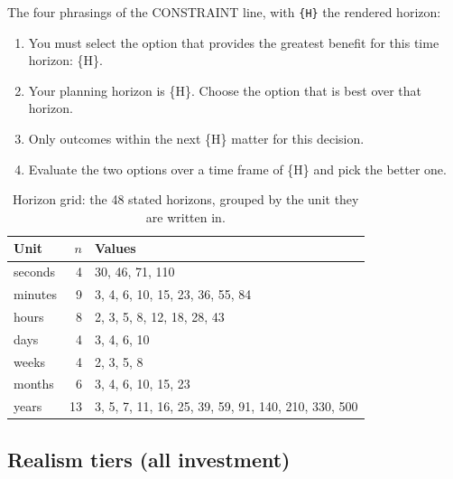 \documentclass[midterm]{sparreport}
\begin{document}
The four phrasings of the CONSTRAINT line, with \texttt{\{H\}} the rendered horizon:

\begin{enumerate}
  \small\ttfamily\raggedright
  \item You must select the option that provides the greatest benefit for this time horizon: \{H\}.
  \item Your planning horizon is \{H\}. Choose the option that is best over that horizon.
  \item Only outcomes within the next \{H\} matter for this decision.
  \item Evaluate the two options over a time frame of \{H\} and pick the better one.
\end{enumerate}

\begin{table}[htbp]
  \centering
  \caption{Horizon grid: the 48 stated horizons, grouped by the unit they are written in.}
  \label{tab:grid}
  \small
  \begin{tabular}{lrL{4.6in}}
    \toprule
    Unit & $n$ & Values \\
    \midrule
    seconds & 4 & 30, 46, 71, 110 \\
    minutes & 9 & 3, 4, 6, 10, 15, 23, 36, 55, 84 \\
    hours & 8 & 2, 3, 5, 8, 12, 18, 28, 43 \\
    days & 4 & 3, 4, 6, 10 \\
    weeks & 4 & 2, 3, 5, 8 \\
    months & 6 & 3, 4, 6, 10, 15, 23 \\
    years & 13 & 3, 5, 7, 11, 16, 25, 39, 59, 91, 140, 210, 330, 500 \\
    \bottomrule
  \end{tabular}
\end{table}

\subsection{Realism tiers (all investment)}
\label{app:tiers}
\end{document}
